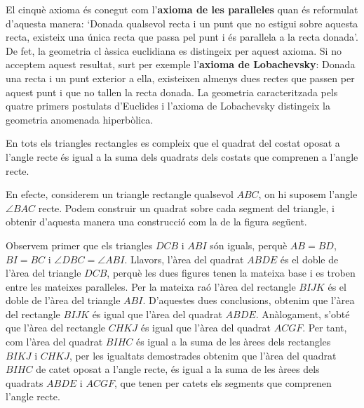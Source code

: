 El cinqu\`{e} axioma \'{e}s conegut com l'\textbf{axioma de les
paral\textperiodcentered leles} quan \'{e}s reformulat d'aquesta manera:
`Donada qualsevol recta i un punt que no estigui sobre aquesta recta,
existeix una \'{u}nica recta que passa pel punt i \'{e}s
paral\textperiodcentered lela a la recta donada'. De fet, la geometria cl%
\`{a}ssica euclidiana es distingeix per aquest axioma. Si no acceptem aquest
resultat, surt per exemple l'\textbf{axioma de Lobachevsky}: Donada una
recta i un punt exterior a ella, existeixen almenys dues rectes que passen
per aquest punt i que no tallen la recta donada. La geometria caracteritzada
pels quatre primers postulats d'Euclides i l'axioma de Lobachevsky
distingeix la geometria anomenada hiperb\`{o}lica.

\begin{teorema}
En tots els triangles rectangles es compleix que el quadrat del costat
oposat a l'angle recte \'{e}s igual a la suma dels quadrats dels costats que
comprenen a l'angle recte.
\end{teorema}

\begin{prova}
En efecte, considerem un triangle rectangle qualsevol $ABC$, on hi suposem
l'angle $\angle BAC$ recte. Podem construir un quadrat sobre cada segment
del triangle, i obtenir d'aquesta manera una construcci\'{o} com la de la
figura seg\"{u}ent. 

Observem primer que els triangles $DCB$ i $ABI$ s\'{o}n iguals, perqu\`{e} $%
AB=BD$, $BI=BC$ i $\angle DBC=\angle ABI$. Llavors, l'\`{a}rea del quadrat $%
ABDE$ \'{e}s el doble de l'\`{a}rea del triangle $DCB$, perqu\`{e} les dues
figures tenen la mateixa base i es troben entre les mateixes
paral\textperiodcentered leles. Per la mateixa ra\'{o} l'\`{a}rea del
rectangle $BIJK$ \'{e}s el doble de l'\`{a}rea del triangle $ABI$.
D'aquestes dues conclusions, obtenim que l'\`{a}rea del rectangle $BIJK$
\'{e}s igual que l'\`{a}rea del quadrat $ABDE$. An\`{a}logament, s'obt\'{e}
que l'\`{a}rea del rectangle $CHKJ$ \'{e}s igual que l'\`{a}rea del quadrat $%
ACGF$. Per tant, com l'\`{a}rea del quadrat $BIHC$ \'{e}s igual a la suma de
les \`{a}rees dels rectangles $BIKJ$ i $CHKJ$, per les igualtats demostrades
obtenim que l'\`{a}rea del quadrat $BIHC$ de catet oposat a l'angle recte,
\'{e}s igual a la suma de les \`{a}rees dels quadrats $ABDE$ i $ACGF$, que
tenen per catets els segments que comprenen l'angle recte.
\end{prova}

